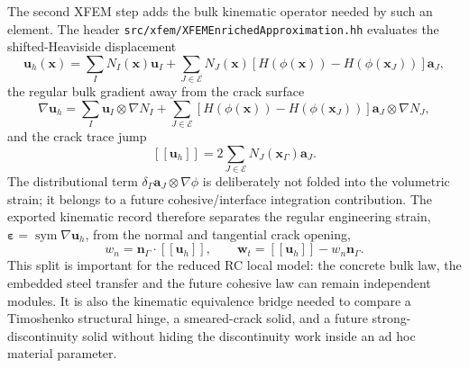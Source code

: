 The second XFEM step adds the bulk kinematic operator needed by such an
element.  The header \texttt{src/xfem/XFEMEnrichedApproximation.hh} evaluates
the shifted-Heaviside displacement
\[
  \mathbf{u}_h(\mathbf{x}) =
  \sum_I N_I(\mathbf{x})\mathbf{u}_I
  +
  \sum_{J\in\mathcal{E}} N_J(\mathbf{x})
  \left[H(\phi(\mathbf{x}))-H(\phi(\mathbf{x}_J))\right]\mathbf{a}_J ,
\]
the regular bulk gradient away from the crack surface
\[
  \nabla\mathbf{u}_h =
  \sum_I \mathbf{u}_I\otimes\nabla N_I
  +
  \sum_{J\in\mathcal{E}}
  \left[H(\phi(\mathbf{x}))-H(\phi(\mathbf{x}_J))\right]
  \mathbf{a}_J\otimes\nabla N_J ,
\]
and the crack trace jump
\[
  \left[\!\left[ \mathbf{u}_h \right]\!\right] =
  2\sum_{J\in\mathcal{E}} N_J(\mathbf{x}_{\Gamma})\mathbf{a}_J .
\]
The distributional term
\(\delta_{\Gamma}\mathbf{a}_J\otimes\nabla\phi\) is deliberately not folded
into the volumetric strain; it belongs to a future cohesive/interface
integration contribution.  The exported kinematic record therefore separates
the regular engineering strain,
\(\boldsymbol\varepsilon=\operatorname{sym}\nabla\mathbf{u}_h\), from the
normal and tangential crack opening,
\[
  w_n=\mathbf{n}_{\Gamma}\cdot
  \left[\!\left[\mathbf{u}_h\right]\!\right],\qquad
  \mathbf{w}_t=
  \left[\!\left[\mathbf{u}_h\right]\!\right]-w_n\mathbf{n}_{\Gamma}.
\]
This split is important for the reduced RC local model: the concrete bulk law,
the embedded steel transfer and the future cohesive law can remain independent
modules.  It is also the kinematic equivalence bridge needed to compare a
Timoshenko structural hinge, a smeared-crack solid, and a future strong-
discontinuity solid without hiding the discontinuity work inside an ad hoc
material parameter.

